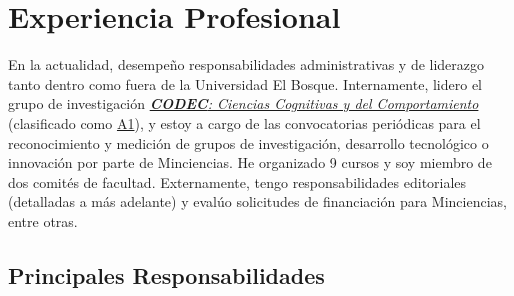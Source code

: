 \documentclass[11pt,a4paper,]{awesome-cv}
\begin{document}
\hypertarget{experiencia-profesional}{%
\section{Experiencia Profesional}\label{experiencia-profesional}}

\begin{footnotesize}
En la actualidad, desempeño responsabilidades administrativas y de liderazgo tanto dentro como fuera de la Universidad El Bosque. Internamente, lidero el grupo de investigación \href{https://investigaciones.unbosque.edu.co/codec}{\textit{\textbf{CODEC}: Ciencias Cognitivas y del Comportamiento}} (clasificado como \href{https://scienti.minciencias.gov.co/gruplac/jsp/visualiza/visualizagr.jsp?nro=00000000001446}{A1}), y estoy a cargo de las convocatorias periódicas para el reconocimiento y medición de grupos de investigación, desarrollo tecnológico o innovación por parte de Minciencias. He organizado 9 cursos y soy miembro de dos comités de facultad. Externamente, tengo responsabilidades editoriales (detalladas a más adelante) y evalúo solicitudes de financiación para Minciencias, entre otras.
\end{footnotesize}

\hypertarget{principales-responsabilidades}{%
\subsection{Principales
Responsabilidades}\label{principales-responsabilidades}}
\end{document}
